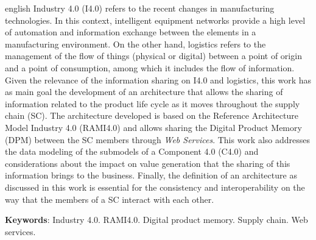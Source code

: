 \begin{resumo}[Abstract]
	\begin{otherlanguage*}{english}
		Industry 4.0 (I4.0) refers to the recent changes in manufacturing technologies. In this context, intelligent equipment networks provide a high level of automation and information exchange between the elements in a manufacturing environment. On the other hand, logistics refers to the management of the flow of things (physical or digital) between a point of origin and a point of consumption, among which it includes the flow of information. Given the relevance of the information sharing on I4.0 and logistics, this work has as main goal the development of an architecture that allows the sharing of information related to the product life cycle as it moves throughout the supply chain (SC). The architecture developed is based on the Reference Architecture Model Industry 4.0 (RAMI4.0) and allows sharing the Digital Product Memory (DPM) between the SC members through \textit{Web Services}. This work also addresses the data modeling of the submodels of a Component 4.0 (C4.0) and considerations about the impact on value generation that the sharing of this information brings to the business. Finally, the definition of an architecture as discussed in this work is essential for the consistency and interoperability on the way that the members of a SC interact with each other.
		\vspace{\onelineskip}

		\noindent
		\textbf{Keywords}: Industry 4.0. RAMI4.0. Digital product memory. Supply chain. Web services.
	\end{otherlanguage*}
\end{resumo}

\listoffigures*
\cleardoublepage

\listoftables*
\cleardoublepage


